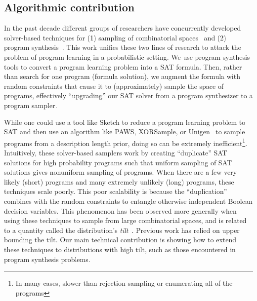 \documentclass{article}
\begin{document}
\subsection{Algorithmic contribution}
In the past decade different groups of researchers have  concurrently developed solver-based %
 techniques for (1) sampling of combinatorial spaces~\cite{gomes2006near,ermon2013embed,ermon2012uniform,chakraborty2014balancing} and (2) program synthesis~\cite{solar2008program,Gulwani:2011:SLP:1993498.1993506}.
This work unifies these two lines of research to attack the problem of program learning in a probabilistic setting.
We use program synthesis tools to convert a program learning problem into a SAT formula.
Then,
rather than search for one program (formula solution),
we augment the formula with random constraints that cause it to (approximately) sample the space of programs,
effectively ``upgrading'' our SAT solver from a program synthesizer to a program sampler.

While one could use a tool like Sketch to reduce a program learning problem to SAT
and then use an algorithm like PAWS, XORSample, or Unigen~\cite{ermon2013embed,gomes2006near,chakraborty2014balancing}
to sample programs from a description length prior,
doing so can be extremely inefficient\footnote{In many cases, slower than rejection sampling or enumerating all of the programs}.
Intuitively,
these solver-based samplers work by creating ``duplicate'' SAT solutions for high probability programs
such that uniform sampling of SAT solutions gives nonuniform sampling of programs.
When there are a few very likely (short) programs and many extremely unlikely (long) programs,
these techniques scale poorly. This poor scalability is because the ``duplication'' combines with the random constraints to entangle otherwise independent Boolean decision variables.
This phenomenon has been observed more generally when using these techniques to sample from large combinatorial spaces,
and is related to a quantity called the distribution's \emph{tilt}~\cite{chakraborty2014distribution}.
Previous work has relied on upper bounding the tilt.
Our main technical contribution is showing how to extend these techniques to distributions with high tilt,
such as those encountered in program synthesis problems.

 
\end{document}
